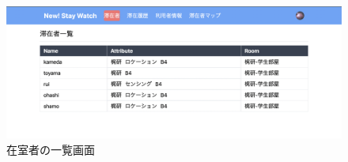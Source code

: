 \begin{figure}[H]
  \begin{center}
    \includegraphics[width=160mm]{image/stayer.png}
    \caption{在室者の一覧画面}
    \label{fig:stayer}
  \end{center}
\end{figure}




